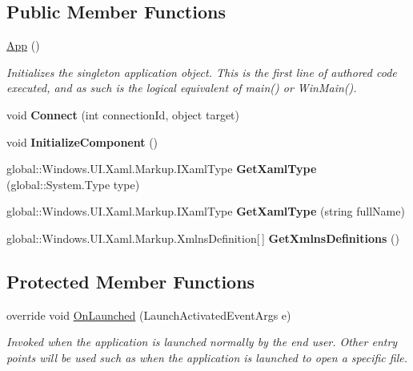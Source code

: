 \subsection*{Public Member Functions}
\begin{DoxyCompactItemize}
\item 
\hyperlink{class__1aarsproeve_1_1_app_a648545b697c46f7f879d3663198c24df}{App} ()
\begin{DoxyCompactList}\small\item\em Initializes the singleton application object. This is the first line of authored code executed, and as such is the logical equivalent of main() or Win\+Main(). \end{DoxyCompactList}\item 
\hypertarget{class__1aarsproeve_1_1_app_adeff2998728d62ed327627d0ac86916a}{}void {\bfseries Connect} (int connection\+Id, object target)\label{class__1aarsproeve_1_1_app_adeff2998728d62ed327627d0ac86916a}

\item 
\hypertarget{class__1aarsproeve_1_1_app_a3253c2995de585aac3f8db9e63fef8d5}{}void {\bfseries Initialize\+Component} ()\label{class__1aarsproeve_1_1_app_a3253c2995de585aac3f8db9e63fef8d5}

\item 
\hypertarget{class__1aarsproeve_1_1_app_a5114dc7c38ce1d6a07c6cf00fc555545}{}global\+::\+Windows.\+U\+I.\+Xaml.\+Markup.\+I\+Xaml\+Type {\bfseries Get\+Xaml\+Type} (global\+::\+System.\+Type type)\label{class__1aarsproeve_1_1_app_a5114dc7c38ce1d6a07c6cf00fc555545}

\item 
\hypertarget{class__1aarsproeve_1_1_app_a53d51c17fe7ca626f8eb7a25f6c24124}{}global\+::\+Windows.\+U\+I.\+Xaml.\+Markup.\+I\+Xaml\+Type {\bfseries Get\+Xaml\+Type} (string full\+Name)\label{class__1aarsproeve_1_1_app_a53d51c17fe7ca626f8eb7a25f6c24124}

\item 
\hypertarget{class__1aarsproeve_1_1_app_a9d2a8b1a028089c66bd83c91b1cc4528}{}global\+::\+Windows.\+U\+I.\+Xaml.\+Markup.\+Xmlns\+Definition\mbox{[}$\,$\mbox{]} {\bfseries Get\+Xmlns\+Definitions} ()\label{class__1aarsproeve_1_1_app_a9d2a8b1a028089c66bd83c91b1cc4528}

\end{DoxyCompactItemize}
\subsection*{Protected Member Functions}
\begin{DoxyCompactItemize}
\item 
override void \hyperlink{class__1aarsproeve_1_1_app_a1792d58bc636406fca229cf51ac6b81c}{On\+Launched} (Launch\+Activated\+Event\+Args e)
\begin{DoxyCompactList}\small\item\em Invoked when the application is launched normally by the end user. Other entry points will be used such as when the application is launched to open a specific file. \end{DoxyCompactList}\end{DoxyCompactItemize}


